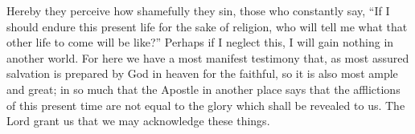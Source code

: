 Hereby they perceive how shamefully they sin, those who constantly say, “If I should endure this present life for the sake of religion, who will tell me what that other life to come will be like?” Perhaps if I neglect this, I will gain nothing in another world. For here we have a most manifest testimony that, as most assured salvation is prepared by God in heaven for the faithful, so it is also most ample and great; in so much that the Apostle in another place says that the afflictions of this present time are not equal to the glory which shall be revealed to us. The Lord grant us that we may acknowledge these things.
